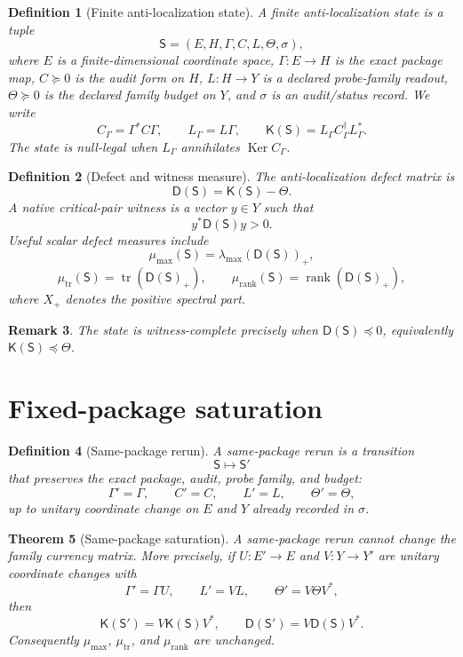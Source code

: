 \documentclass[11pt]{article}
\newtheorem{theorem}{Theorem}[section]
\newtheorem{definition}[theorem]{Definition}
\newtheorem{remark}[theorem]{Remark}
\newcommand{\K}{\mathsf K}
\newcommand{\D}{\mathsf D}
\newcommand{\Sstate}{\mathsf S}
\newcommand{\Ker}{\operatorname{Ker}}
\newcommand{\Tr}{\operatorname{tr}}
\begin{document}
\begin{definition}[Finite anti-localization state]
A finite anti-localization state is a tuple
\[
  \Sstate=(E,H,\Gamma,C,L,\Theta,\sigma),
\]
where $E$ is a finite-dimensional coordinate space, $\Gamma:E\to H$ is the exact package map, $C\succeq0$ is the audit form on $H$, $L:H\to Y$ is a declared probe-family readout, $\Theta\succeq0$ is the declared family budget on $Y$, and $\sigma$ is an audit/status record. We write
\[
  C_\Gamma=\Gamma^*C\Gamma,
  \qquad L_\Gamma=L\Gamma,
  \qquad \K(\Sstate)=L_\Gamma C_\Gamma^\dagger L_\Gamma^* .
\]
The state is null-legal when $L_\Gamma$ annihilates $\Ker C_\Gamma$.
\end{definition}

\begin{definition}[Defect and witness measure]
The anti-localization defect matrix is
\[
  \D(\Sstate)=\K(\Sstate)-\Theta.
\]
A native critical-pair witness is a vector $y\in Y$ such that
\[
  y^*\D(\Sstate)y>0.
\]
Useful scalar defect measures include
\[
  \mu_{\max}(\Sstate)=\lambda_{\max}(\D(\Sstate))_+,
\]
\[
  \mu_{\Tr}(\Sstate)=\Tr(\D(\Sstate)_+),
  \qquad
  \mu_{\mathrm{rank}}(\Sstate)=\operatorname{rank}(\D(\Sstate)_+),
\]
where $X_+$ denotes the positive spectral part.
\end{definition}

\begin{remark}
The state is witness-complete precisely when $\D(\Sstate)\preceq0$, equivalently $\K(\Sstate)\preceq\Theta$.
\end{remark}

\section{Fixed-package saturation}

\begin{definition}[Same-package rerun]
A same-package rerun is a transition
\[
  \Sstate\longmapsto \Sstate'
\]
that preserves the exact package, audit, probe family, and budget:
\[
  \Gamma'=\Gamma,
  \qquad C'=C,
  \qquad L'=L,
  \qquad \Theta'=\Theta,
\]
up to unitary coordinate change on $E$ and $Y$ already recorded in $\sigma$.
\end{definition}

\begin{theorem}[Same-package saturation]
A same-package rerun cannot change the family currency matrix. More precisely, if $U:E'\to E$ and $V:Y\to Y'$ are unitary coordinate changes with
\[
  \Gamma'=\Gamma U,
  \qquad L'=V L,
  \qquad \Theta'=V\Theta V^*,
\]
then
\[
  \K(\Sstate')=V\K(\Sstate)V^*,
  \qquad
  \D(\Sstate')=V\D(\Sstate)V^*.
\]
Consequently $\mu_{\max}$, $\mu_{\Tr}$, and $\mu_{\mathrm{rank}}$ are unchanged.
\end{theorem}
\end{document}
